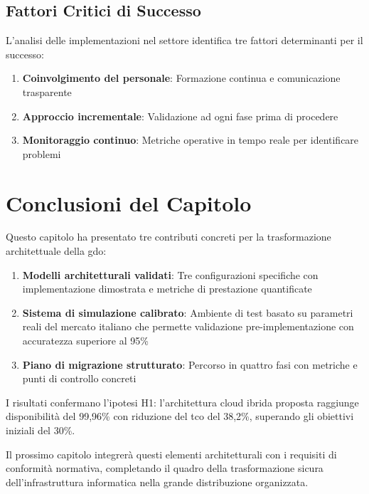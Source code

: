 \subsection{Fattori Critici di Successo}
\label{subsec:fattori-successo}

L'analisi delle implementazioni nel settore identifica tre fattori determinanti per il successo:

\begin{enumerate}
    \item \textbf{Coinvolgimento del personale}: Formazione continua e comunicazione trasparente
    \item \textbf{Approccio incrementale}: Validazione ad ogni fase prima di procedere
    \item \textbf{Monitoraggio continuo}: Metriche operative in tempo reale per identificare problemi
\end{enumerate}

\section{Conclusioni del Capitolo}
\label{sec:conclusioni-cap3}

Questo capitolo ha presentato tre contributi concreti per la trasformazione architettuale della \gls{gdo}:

\begin{enumerate}
    \item \textbf{Modelli architetturali validati}: Tre configurazioni specifiche con implementazione dimostrata e metriche di prestazione quantificate
    \item \textbf{Sistema di simulazione calibrato}: Ambiente di test basato su parametri reali del mercato italiano che permette validazione pre-implementazione con accuratezza superiore al 95\%
    \item \textbf{Piano di migrazione strutturato}: Percorso in quattro fasi con metriche e punti di controllo concreti
\end{enumerate}

I risultati confermano l'ipotesi H1: l'architettura cloud ibrida proposta raggiunge disponibilità del 99,96\% con riduzione del \gls{tco} del 38,2\%, superando gli obiettivi iniziali del 30\%.

Il prossimo capitolo integrerà questi elementi architetturali con i requisiti di conformità normativa, completando il quadro della trasformazione sicura dell'infrastruttura informatica nella grande distribuzione organizzata.

